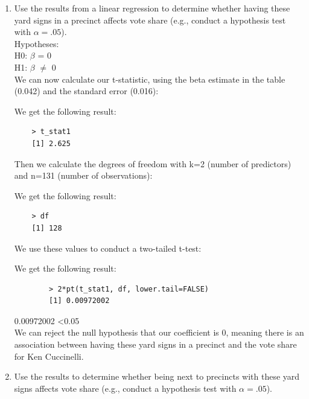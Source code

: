 \documentclass[12pt,letterpaper]{article}
\begin{document}
\vspace{.5cm}
\begin{enumerate}
	\item [(a)] Use the results from a linear regression to determine whether having these yard signs in a precinct affects vote share (e.g., conduct a hypothesis test with $\alpha = .05$).\\
	
	Hypotheses:\\
	H0: $\beta$ = 0\\
	H1: $\beta$ $\neq$ 0\\
	
	\vspace{.5cm}
	We can now calculate our t-statistic, using the beta estimate in the table (0.042) and the standard error (0.016):
	
	 
	
	We get the following result:
	
	\begin{verbatim}
	> t_stat1
	[1] 2.625
	\end{verbatim}
	
	Then we calculate the degrees of freedom with k=2 (number of predictors) and n=131 (number of observations):
	 
	
	We get the following result:
	
	\begin{verbatim}
	> df
	[1] 128
	\end{verbatim}
	
	We use these values to conduct a two-tailed t-test:
	 
	
	We get the following result:
	
	\begin{verbatim}
		> 2*pt(t_stat1, df, lower.tail=FALSE)
		[1] 0.00972002
	\end{verbatim}
	
	0.00972002 \textless 0.05 \\ 
	We can reject the null hypothesis that our coefficient is 0,
	meaning there is an association between having these yard signs in a precinct and the vote share for Ken Cuccinelli.
	
	
	\newpage		
	\item [(b)]  Use the results to determine whether being
	next to precincts with these yard signs affects vote
	share (e.g., conduct a hypothesis test with $\alpha = .05$). \\
	

\end{enumerate}
\end{document}
